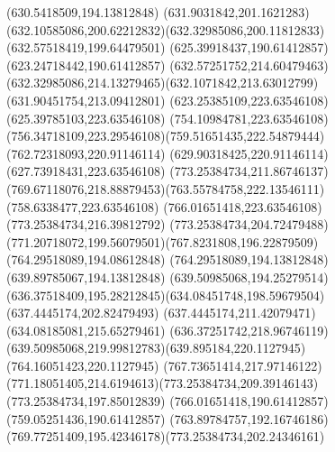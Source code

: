 {{	\lineto(630.5418509,194.13812848)
	\closepath
	\moveto(631.9031842,201.1621283)
	\curveto(632.10585086,200.62212832)(632.32985086,200.11812833)(632.57518419,199.64479501)
	\lineto(625.39918437,190.61412857)
	\lineto(623.24718442,190.61412857)
	\closepath
	\moveto(632.57251752,214.60479463)
	\curveto(632.32985086,214.13279465)(632.1071842,213.63012799)(631.90451754,213.09412801)
	\lineto(623.25385109,223.63546108)
	\lineto(625.39785103,223.63546108)
	\closepath
	\moveto(754.10984781,223.63546108)
	\curveto(756.34718109,223.29546108)(759.51651435,222.54879444)(762.72318093,220.91146114)
	\lineto(629.90318425,220.91146114)
	\lineto(627.73918431,223.63546108)
	\closepath
	\moveto(773.25384734,211.86746137)
	\curveto(769.67118076,218.88879453)(763.55784758,222.13546111)(758.6338477,223.63546108)
	\lineto(766.01651418,223.63546108)
	\lineto(773.25384734,216.39812792)
	\closepath
	\moveto(773.25384734,204.72479488)
	\curveto(771.20718072,199.56079501)(767.8231808,196.22879509)(764.29518089,194.08612848)
	\lineto(764.29518089,194.13812848)
	\lineto(639.89785067,194.13812848)
	\curveto(639.50985068,194.25279514)(636.37518409,195.28212845)(634.08451748,198.59679504)
	\lineto(637.4445174,202.82479493)
	\lineto(637.4445174,211.42079471)
	\lineto(634.08185081,215.65279461)
	\curveto(636.37251742,218.96746119)(639.50985068,219.99812783)(639.895184,220.1127945)
	\lineto(764.16051423,220.1127945)
	\curveto(767.73651414,217.97146122)(771.18051405,214.6194613)(773.25384734,209.39146143)
	\closepath
	\moveto(773.25384734,197.85012839)
	\lineto(766.01651418,190.61412857)
	\lineto(759.05251436,190.61412857)
	\curveto(763.89784757,192.16746186)(769.77251409,195.42346178)(773.25384734,202.24346161)
	\closepath
}
}
{
}
